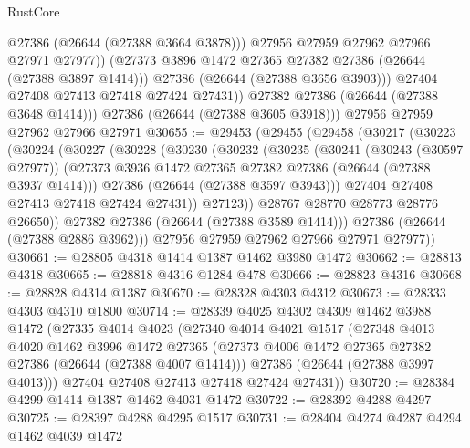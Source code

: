 \begin{lexlean}{RustCore}
\begin{coremodule}
                    @27386
                    (@26644 (@27388 @3664 @3878)))
                  @27956
                  @27959
                  @27962
                  @27966
                  @27971
                  @27977))
              (@27373 @3896 @1472 @27365 @27382 @27386 (@26644 (@27388 @3897 @1414)))
              @27386
              (@26644 (@27388 @3656 @3903)))
            @27404
            @27408
            @27413
            @27418
            @27424
            @27431))
        @27382
        @27386
        (@26644 (@27388 @3648 @1414)))
      @27386
      (@26644 (@27388 @3605 @3918)))
    @27956
    @27959
    @27962
    @27966
    @27971
@30655 := @29453
    (@29455
      (@29458
        (@30217
          (@30223
            (@30224
              (@30227
                (@30228
                  (@30230
                    (@30232
                      (@30235
                        (@30241
                          (@30243 (@30597 @27977))
                          (@27373 @3936 @1472 @27365 @27382 @27386 (@26644 (@27388 @3937 @1414)))
                          @27386
                          (@26644 (@27388 @3597 @3943)))
                        @27404
                        @27408
                        @27413
                        @27418
                        @27424
                        @27431))
                    @27123))
                @28767
                @28770
                @28773
                @28776
                @26650))
            @27382
            @27386
            (@26644 (@27388 @3589 @1414)))
          @27386
          (@26644 (@27388 @2886 @3962)))
        @27956
        @27959
        @27962
        @27966
        @27971
        @27977))
@30661 := @28805 @4318 @1414 @1387 @1462 @3980 @1472
@30662 := @28813 @4318
@30665 := @28818 @4316 @1284 @478
@30666 := @28823 @4316
@30668 := @28828 @4314 @1387
@30670 := @28328 @4303 @4312
@30673 := @28333 @4303 @4310 @1800
@30714 := @28339
    @4025
    @4302
    @4309
    @1462
    @3988
    @1472
    (@27335
      @4014
      @4023
      (@27340
        @4014
        @4021
        @1517
        (@27348
          @4013
          @4020
          @1462
          @3996
          @1472
          @27365
          (@27373 @4006 @1472 @27365 @27382 @27386 (@26644 (@27388 @4007 @1414)))
          @27386
          (@26644 (@27388 @3997 @4013)))
        @27404
        @27408
        @27413
        @27418
        @27424
        @27431))
@30720 := @28384 @4299 @1414 @1387 @1462 @4031 @1472
@30722 := @28392 @4288 @4297
@30725 := @28397 @4288 @4295 @1517
@30731 := @28404 @4274 @4287 @4294 @1462 @4039 @1472

\end{coremodule}
\end{lexlean}
